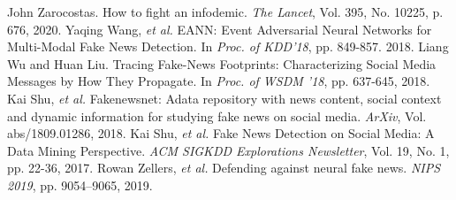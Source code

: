 {	{\footnotesize 
	\begin{thebibliography}{99}
		\setlength{\parskip}{0cm}
		\setlength{\itemsep}{0cm}
		\begin{spacing}{0.6}
		 John Zarocostas. How to fight an infodemic. \textit{The Lancet}, Vol. 395, No. 10225, p. 676, 2020.
		 Yaqing Wang, \textit{et al.} EANN: Event Adversarial Neural Networks for Multi-Modal Fake News Detection. In \textit{Proc. of KDD'18}, pp. 849-857. 2018.
		 Liang Wu and Huan Liu. Tracing Fake-News Footprints: Characterizing Social Media Messages by How They Propagate. In \textit{Proc. of WSDM '18},  pp. 637-645, 2018.
		 Kai Shu, \textit{et al.} Fakenewsnet: Adata repository with news content, social context and dynamic information for studying fake news on social media. \textit{ArXiv}, Vol. abs/1809.01286, 2018.
		 Kai Shu, \textit{et al.} Fake News Detection on Social Media: A Data Mining Perspective. \textit{ACM SIGKDD Explorations Newsletter}, Vol. 19, No. 1, pp. 22-36, 2017.
		 Rowan Zellers, \textit{et al.} Defending against neural fake news. \textit{NIPS 2019}, pp. 9054–9065, 2019.
		\end{spacing}
	\end{thebibliography}
	}
}

